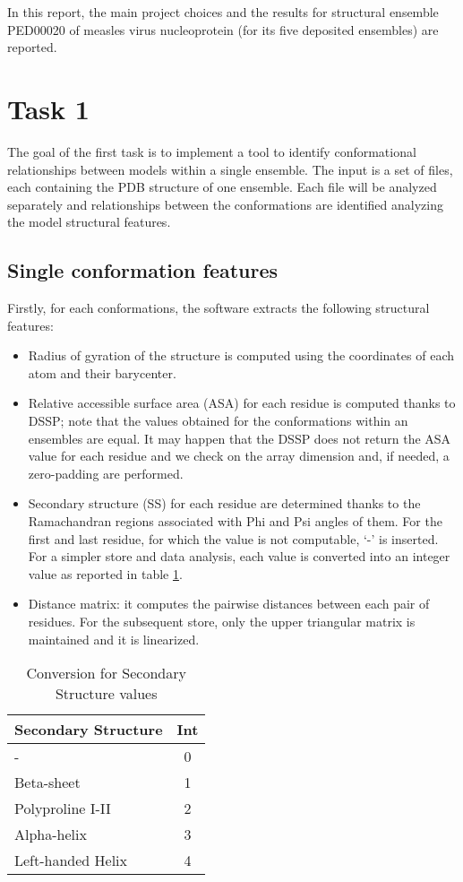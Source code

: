 In this report, the main project choices and the results for structural ensemble PED00020 of measles virus nucleoprotein (for its five deposited ensembles) are reported.

\section{Task 1}\label{sec:task1}
\graphicspath{ {./figures/} }

The goal of the first task is to implement a tool to identify conformational relationships between models within a single ensemble. The input is a set of files, each containing the PDB structure of one ensemble. Each file will be analyzed separately and relationships between the conformations are identified analyzing the model structural features. 


\subsection{Single conformation features}

Firstly, for each conformations, the software extracts the following structural features:
\begin{itemize}
\item Radius of gyration of the structure is computed using the coordinates of each atom and their barycenter.
\item Relative accessible surface area (ASA) for each residue is computed thanks to DSSP; note that the values obtained for the conformations within an ensembles are equal. It may happen that the DSSP does not return the ASA value for each residue and we check on the array dimension and, if needed, a zero-padding are performed. 
\item Secondary structure (SS) for each residue are determined thanks to the Ramachandran regions associated with Phi and Psi angles of them. For the first and last residue, for which the value is not computable, `-' is inserted. For a simpler store and data analysis, each value is converted into an integer value as reported in table \ref{tab:ss}. 
\item Distance matrix: it computes the pairwise distances between each pair of residues. For the subsequent store, only the upper triangular matrix is maintained and it is linearized. 
\end{itemize}

\begin{table}[H]
\begin{center}
\begin{tabular}{lc}
\textbf{Secondary Structure} & \textbf{Int}\\
\hline
- & 0\\
\hline
Beta-sheet & 1\\
\hline
Polyproline I-II & 2\\
\hline
Alpha-helix & 3\\
\hline
Left-handed Helix & 4\\
\end{tabular}
\end{center}
\caption{Conversion for Secondary Structure values}~\label{tab:ss}
\end{table}


